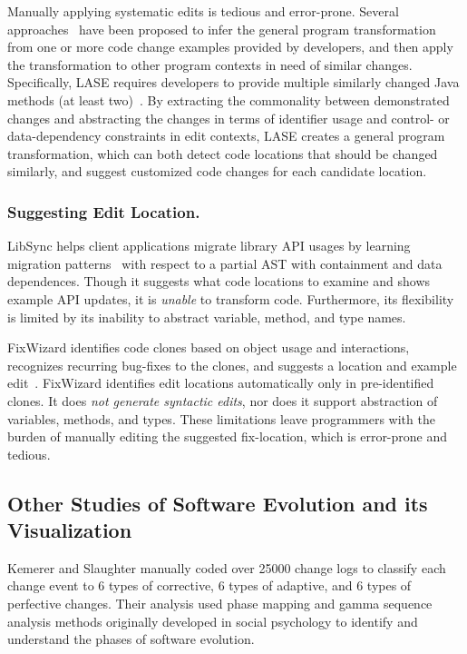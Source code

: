 \documentclass[runningheads,a4paper]{llncs}
\begin{document}
Manually applying systematic edits is tedious and error-prone. 
Several approaches~\cite{MKM2011,Meng12:lase,Rolim:2017} have been proposed to infer the general program transformation from one or more code change examples provided by developers, and then apply the transformation to other program contexts in need of similar changes. Specifically, LASE requires developers to provide multiple similarly changed Java methods (at least two)~\cite{Meng12:lase}. By extracting the commonality between demonstrated changes and abstracting the changes in terms of identifier usage and control- or data-dependency constraints in edit contexts, LASE creates a general program transformation, which can both detect code locations that should be changed similarly, and suggest customized code changes for each candidate location.

\subsubsection{Suggesting Edit Location.}

LibSync helps client applications migrate library API usages by learning migration patterns~\cite{Nguyen2010:GAA} with respect to a partial AST with containment and data dependences. Though it suggests what code locations to examine and shows example API updates, it is \emph{unable} to transform code.  Furthermore, its flexibility is limited by its inability to abstract variable, method, and type names.

FixWizard identifies code clones based on object usage and interactions, recognizes recurring bug-fixes to the clones, and suggests a location and example edit~\cite{Nguyen2010:RBF}. FixWizard identifies edit locations automatically only in pre-identified clones.  It does {\em not generate syntactic edits}, nor does it support abstraction of variables, methods, and types. These limitations leave programmers with the burden of manually editing the suggested fix-location, which is error-prone and tedious.

\subsection{Other Studies of Software Evolution and its Visualization} 
Kemerer and Slaughter \cite{Kemerer1999} manually coded over 25000 change logs to classify each change event to 6 types of corrective, 6 types of adaptive, and 6 types of perfective changes. Their analysis used phase mapping and gamma sequence analysis methods originally developed in social psychology to identify and understand the phases of software evolution. 
\end{document}
